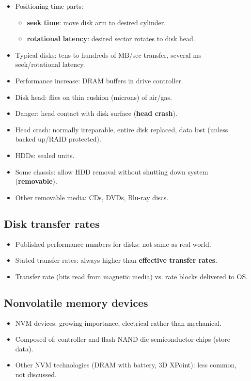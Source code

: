 \begin{itemize}
    \item Positioning time parts:
    \begin{itemize}
        \item \textbf{seek time}: move disk arm to desired cylinder.
        \item \textbf{rotational latency}: desired sector rotates to disk head.
    \end{itemize}
    \item Typical disks: tens to hundreds of MB/sec transfer, several ms seek/rotational latency.
    \item Performance increase: DRAM buffers in drive controller.
    \item Disk head: flies on thin cushion (microns) of air/gas.
    \item Danger: head contact with disk surface (\textbf{head crash}).
    \item Head crash: normally irreparable, entire disk replaced, data lost (unless backed up/RAID protected).
    \item HDDs: sealed units.
    \item Some chassis: allow HDD removal without shutting down system (\textbf{removable}).
    \item Other removable media: CDs, DVDs, Blu-ray discs.
\end{itemize}

\subsection{Disk transfer rates}
\begin{itemize}
    \item Published performance numbers for disks: not same as real-world.
    \item Stated transfer rates: always higher than \textbf{effective transfer rates}.
    \item Transfer rate (bits read from magnetic media) vs. rate blocks delivered to OS.
\end{itemize}

\subsection{Nonvolatile memory devices}
\begin{itemize}
    \item NVM devices: growing importance, electrical rather than mechanical.
    \item Composed of: controller and flash NAND die semiconductor chips (store data).
    \item Other NVM technologies (DRAM with battery, 3D XPoint): less common, not discussed.
\end{itemize}

